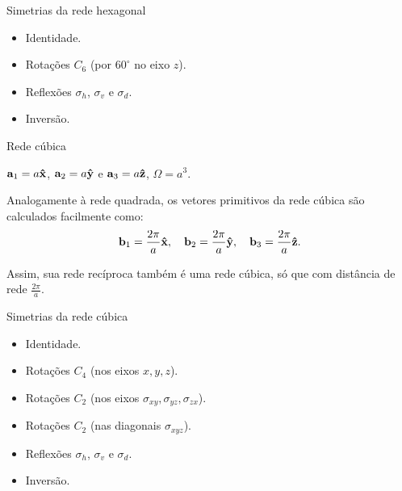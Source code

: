\documentclass[aspectratio=169]{beamer}
\begin{document}


\begin{frame}{Simetrias da rede hexagonal}

\begin{itemize}
\item Identidade.
\n\n
\item Rotações $C_6$ (por $60^\circ$ no eixo $z$).
\n\n
\item Reflexões $\sigma_h$, $\sigma_v$ e $\sigma_d$.
\n\n
\item Inversão.
\end{itemize}

\end{frame}




\begin{frame}{Rede cúbica}

$\vb{a}_1 = a \vu{x}$, $\vb{a}_2 = a\vu{y}$ e $\vb{a}_3 = a\vu{z}$, $\Omega = a^3$.

\n

Analogamente à rede quadrada, os vetores primitivos da rede cúbica são calculados facilmente como:
$$
\vb{b}_1 = \frac{2\pi}{a} \vu{x}, \quad \vb{b}_2 = \frac{2\pi}{a} \vu{y}, \quad \vb{b}_3 = \frac{2\pi}{a} \vu{z}.
$$

Assim, sua rede recíproca também é uma rede cúbica, só que com distância de rede $\frac{2\pi}{a}$.

\end{frame}




\begin{frame}{Simetrias da rede cúbica}

\begin{itemize}
\item Identidade.
\n\n
\item Rotações $C_4$ (nos eixos $x, y, z$).
\n\n
\item Rotações $C_2$ (nos eixos $\sigma_{xy}, \sigma_{yz}, \sigma_{zx}$).
\n\n
\item Rotações $C_2$ (nas diagonais $\sigma_{xyz}$).
\n\n
\item Reflexões $\sigma_h$, $\sigma_v$ e $\sigma_d$.
\n\n
\item Inversão.
\end{itemize}

\end{frame}
\end{document}
